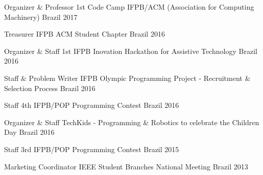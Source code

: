 

\begin{cvhonors}


\cvhonor
    {Organizer \& Professor} %
    {1st Code Camp IFPB/ACM (Association for Computing Machinery)} %
    {Brazil} %
    {2017} %

  \cvhonor
    {Treasurer} %
    {IFPB ACM Student Chapter} %
    {Brazil} %
    {2016} %

  \cvhonor
    {Organizer \& Staff} %
    {1st IFPB Inovation Hackathon for Assistive Technology} %
    {Brazil} %
    {2016} %

  \cvhonor
    {Staff \& Problem Writer} %
    {IFPB Olympic Programming Project - Recruitment \& Selection Process} %
    {Brazil} %
    {2016} %
    
  \cvhonor
    {Staff} %
    {4th IFPB/POP Programming Contest} %
    {Brazil} %
    {2016} %
    
  \cvhonor
    {Organizer \& Staff} %
    {TechKids - Programming \& Robotics to celebrate the Children Day} %
    {Brazil} %
    {2016} %

  \cvhonor
    {Staff} %
    {3rd IFPB/POP Programming Contest} %
    {Brazil} %
    {2015} %

  \cvhonor
    {Marketing Coordinator} %
    {IEEE Student Branches National Meeting} %
    {Brazil} %
    {2013} %


\end{cvhonors}
